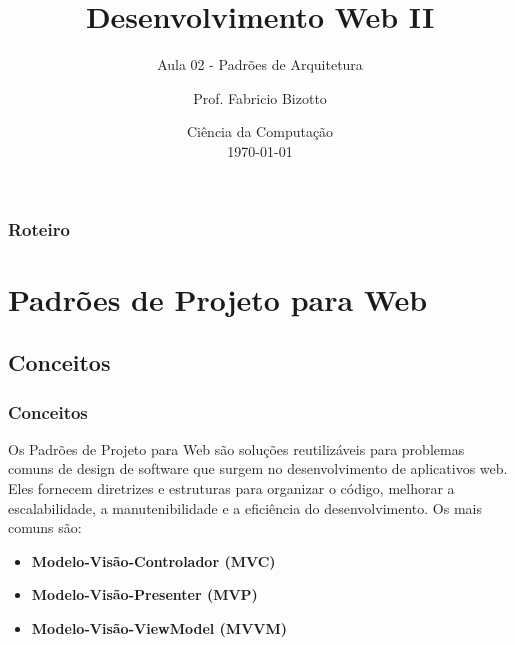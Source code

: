 \documentclass[
	9pt, %
	t, %
]{beamer}
\title[DesWebII]{Desenvolvimento Web II} %
\subtitle{Aula 02 - Padrões de Arquitetura} %
\author[Fabricio Bizotto]{Prof. Fabricio Bizotto} %
\institute[IFC]{Instituto Federal Catarinense \\ \smallskip \textit{fabricio.bizotto@ifc.edu.br}} %
\date[\today]{Ciência da Computação \\ \today} %
\begin{document}

\begin{frame}
	\titlepage %
\end{frame}


\begin{frame}
	\frametitle{Roteiro} %
	
	\tableofcontents %
\end{frame}


\section{Padrões de Projeto para Web} %


\subsection{Conceitos}

\begin{frame}
	\frametitle{Conceitos}
	
	Os \alert{Padrões de Projeto para Web} são soluções reutilizáveis para problemas comuns de design de software que surgem no desenvolvimento de aplicativos web. Eles fornecem \alert{diretrizes e estruturas} para organizar o código, melhorar a escalabilidade, a manutenibilidade e a eficiência do desenvolvimento. Os mais comuns são:

	\begin{itemize}
		\item \textbf{Modelo-Visão-Controlador (MVC)}
		\item \textbf{Modelo-Visão-Presenter (MVP)}
		\item \textbf{Modelo-Visão-ViewModel (MVVM)}
	\end{itemize}
\end{frame}
\end{document}
